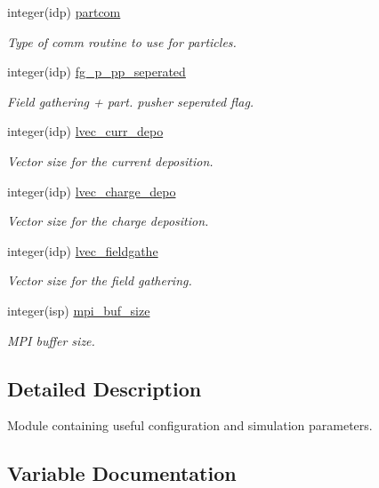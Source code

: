 \begin{DoxyCompactItemize}
integer(idp) \hyperlink{namespaceparams_aa63204e737d29465924b4275b46ddfb3}{partcom}
\begin{DoxyCompactList}\small\item\em Type of comm routine to use for particles. \end{DoxyCompactList}\item 
integer(idp) \hyperlink{namespaceparams_a58efb719fdc3fbbfa8c6beb237ce2716}{fg\+\_\+p\+\_\+pp\+\_\+seperated}
\begin{DoxyCompactList}\small\item\em Field gathering + part. pusher seperated flag. \end{DoxyCompactList}\item 
integer(idp) \hyperlink{namespaceparams_aedb04c2dd01619937eaad2ce0a2626a5}{lvec\+\_\+curr\+\_\+depo}
\begin{DoxyCompactList}\small\item\em Vector size for the current deposition. \end{DoxyCompactList}\item 
integer(idp) \hyperlink{namespaceparams_a73dceeb78f9f0abe2d39ba48e2aee2d9}{lvec\+\_\+charge\+\_\+depo}
\begin{DoxyCompactList}\small\item\em Vector size for the charge deposition. \end{DoxyCompactList}\item 
integer(idp) \hyperlink{namespaceparams_acb2db26088c715aabd2ca6722e0bcdc6}{lvec\+\_\+fieldgathe}
\begin{DoxyCompactList}\small\item\em Vector size for the field gathering. \end{DoxyCompactList}\item 
integer(isp) \hyperlink{namespaceparams_aa785f776093a166811d21fa25c320b75}{mpi\+\_\+buf\+\_\+size}
\begin{DoxyCompactList}\small\item\em M\+PI buffer size. \end{DoxyCompactList}\end{DoxyCompactItemize}


\subsection{Detailed Description}
Module containing useful configuration and simulation parameters. 

\subsection{Variable Documentation}
